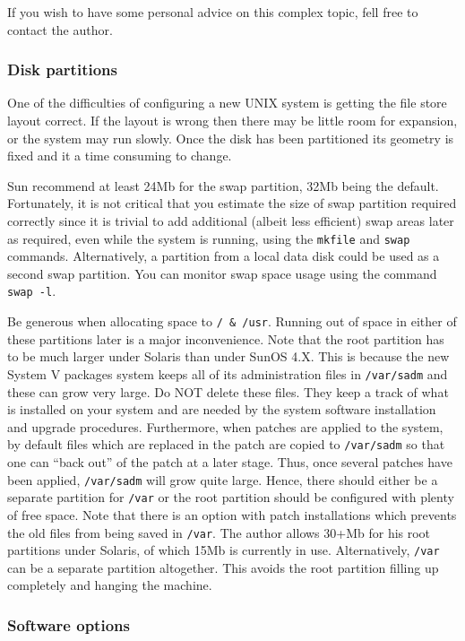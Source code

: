If you wish to have some personal advice on this complex topic, fell free to
contact the author. 

\subsubsection{Disk partitions}

One of the difficulties of configuring a new UNIX system is getting the
file store layout correct. If the layout is wrong then there may be little room
for expansion, or the system may run slowly. Once the disk has been partitioned
its geometry is fixed and it a time consuming to change.


Sun recommend at least 24Mb for the swap partition, 32Mb being the default. 
Fortunately, it is not critical that you estimate the size of swap partition
required correctly since it is trivial to add additional (albeit less efficient)
swap areas later as required, even while the system is running, using the
\verb+mkfile+ and \verb+swap+ commands. Alternatively, a partition
from a local data disk could be used as a second swap partition. 
You can monitor swap space usage using the command \verb+swap -l+.

Be generous when allocating space to {\tt / \& /usr}. Running out of
space in either of these partitions later is a major inconvenience.
Note that the root partition has to be much larger under Solaris than
under SunOS 4.X.  This is because the new System V packages system
keeps all of its administration files in {\tt /var/sadm} and these can
grow very large.  Do NOT delete these files. They keep a track of what
is installed on your system and are needed by the system software
installation and upgrade procedures. Furthermore, when patches are applied
to the system, by default files which are replaced in the patch are copied
to {\tt /var/sadm} so that one can ``back out'' of the patch at a later
stage. Thus, once several patches have been applied, {\tt /var/sadm}
will grow quite large. Hence, there should either be a separate partition 
for {\tt /var} or the root partition should be configured with plenty 
of free space. Note that there is an option with patch installations which
prevents the old files from being saved in {\tt /var}.
The author allows 30+Mb for his
root partitions under Solaris, of which 15Mb is currently in use.
Alternatively, {\tt /var} can be a separate partition altogether. This
avoids the root partition filling up completely and hanging the machine. 

\subsubsection{Software options}


